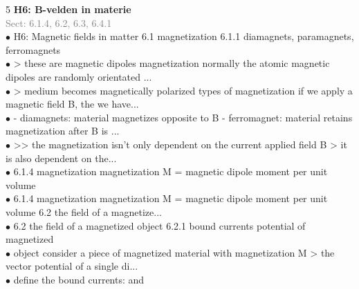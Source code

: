 \documentclass[7pt,a4paper]{article}
\begin{document}
\begin{multicols*}{5}
\textbf{H6: B-velden in materie}\\\textcolor{gray}{{Sect: 6.1.4, 6.2, 6.3, 6.4.1}}\\\vspace{0.5pt}
$\bullet$ H6: Magnetic fields in matter 
6.1 magnetization 
6.1.1 diamagnets, paramagnets, ferromagnets\\
$\bullet$ > these are magnetic dipoles 
magnetization normally the atomic magnetic dipoles are randomly orientated  
...\\
$\bullet$ > medium becomes magnetically polarized 
types of magnetization if we apply a magnetic field B, the we have...\\
$\bullet$ - diamagnets: material magnetizes opposite to B 
 - ferromagnet: material retains magnetization after B is ...\\
$\bullet$ >> the magnetization isn't only dependent on the current applied field B 
    > it is also dependent on the...\\
$\bullet$ 6.1.4 magnetization 
magnetization M = magnetic dipole moment per unit volume\\
$\bullet$ 6.1.4 magnetization 
magnetization M = magnetic dipole moment per unit volume 
6.2 the field of a magnetize...\\
$\bullet$ 6.2 the field of a magnetized object 
6.2.1 bound currents 
potential of magnetized\\
$\bullet$ object 
consider a piece of magnetized material with magnetization M 
> the vector potential of a single di...\\
$\bullet$ define the bound currents: 
    and\\
\columnbreak


\end{multicols*}

\newpage
\end{document}
